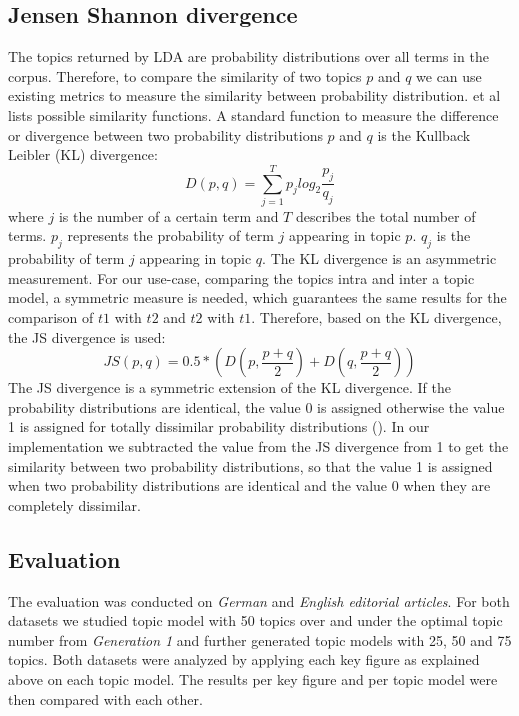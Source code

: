 \subsection{Jensen Shannon divergence}
The topics returned by \ac{LDA} are probability distributions over all terms in the corpus. Therefore, to compare the similarity of two topics $p$ and $q$ we can use existing metrics to measure the similarity between probability distribution. \cite{Lin1991} et al lists possible similarity functions. A standard function to measure the difference or divergence between two probability distributions $p$ and $q$ is the Kullback Leibler (\ac{KL}) divergence:
\begin{equation}
	D(p,q) = \sum_{j=1}^{T} p_{j} log_{2} \frac{p_{j}}{q_{j}}
\end{equation}
 where $j$ is the number of a certain term and $T$ describes the total number of terms. $p_{j}$ represents the probability of term $j$ appearing in topic $p$. $q_{j}$ is the probability of term $j$ appearing in topic $q$. The \ac{KL} divergence is an asymmetric measurement. For our use-case, comparing the topics intra and inter a topic model, a symmetric measure is needed, which guarantees the same results for the comparison of $t1$ with $t2$ and $t2$ with $t1$. Therefore, based on the \ac{KL} divergence, the \ac{JS} divergence is used:
\begin{equation}
	JS(p,q)  = 0.5 * (D(p,\frac{p + q}{2}) + D(q, \frac{p + q}{2}) )
\end{equation}
The \ac{JS} divergence  is a symmetric extension of the \ac{KL} divergence. If the probability distributions are identical, the value 0 is assigned otherwise the value 1 is assigned for totally dissimilar probability distributions (\cite{Steyvers2007}).
In our implementation we subtracted the value from the \ac{JS} divergence from 1 to get the similarity between two probability distributions, so that the value 1 is assigned when two probability distributions are identical and the value 0 when they are completely dissimilar. 

\subsection{Evaluation}
The evaluation was conducted on \textit{German} and \textit{English editorial articles}. For both datasets we studied topic model with 50 topics over and under the optimal topic number from \textit{Generation 1} and further generated topic models with 25, 50 and  75 topics. Both datasets were analyzed by applying each key figure as explained above on each topic model. The results per key figure and per topic model were then compared with each other.
